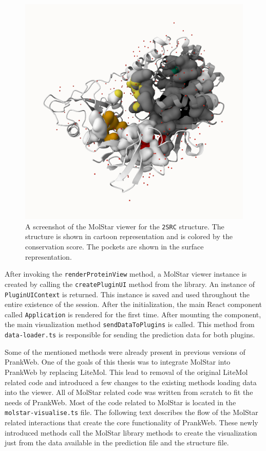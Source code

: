 \begin{figure}[htb]
    \centering
    \includegraphics[width=\textwidth]{img/molstar_2src.png}
    \caption{A screenshot of the MolStar viewer for the \texttt{2SRC} structure. The structure is shown in cartoon representation and is colored by the conservation score. The pockets are shown in the surface representation.}
    \label{fig:molstar}
\end{figure}

After invoking the \texttt{renderProteinView} method, a MolStar viewer instance is created by calling the \texttt{createPluginUI} method from the library. An instance of \texttt{PluginUIContext} is returned. This instance is saved and used throughout the entire existence of the session. After the initialization, the main React component called \texttt{Application} is rendered for the first time. After mounting the component, the main visualization method \texttt{sendDataToPlugins} is called. This method from \texttt{data-loader.ts} is responsible for sending the prediction data for both plugins.

Some of the mentioned methods were already present in previous versions of PrankWeb. One of the goals of this thesis was to integrate MolStar into PrankWeb by replacing LiteMol. This lead to removal of the original LiteMol related code and introduced a few changes to the existing methods loading data into the viewer. All of MolStar related code was written from scratch to fit the needs of PrankWeb. Most of the code related to MolStar is located in the \texttt{molstar-visualise.ts} file. The following text describes the flow of the MolStar related interactions that create the core functionality of PrankWeb. These newly introduced methods call the MolStar library methods to create the visualization just from the data available in the prediction file and the structure file.


